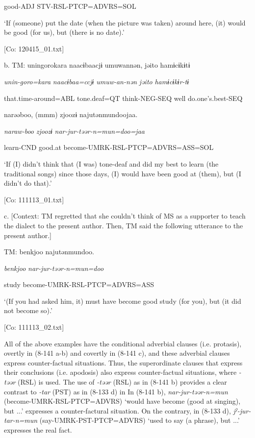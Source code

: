       good-ADJ  STV-RSL-PTCP=ADVRS=SOL  

      ‘If (someone) put the date (when the picture was taken) around here, (it) would be good (for us), but (there is no date).’

      [Co: 120415\_01.txt]

  b.  TM:  unin{\textbar}goro{\textbar}kara  naacɨbaacjɨ  umuwannən,  jəito  hamɨcɨkɨtɨ

      \textit{unin-goro=kara}  \textit{naacɨbaa=ccjɨ}  \textit{umuw-an-nən}  \textit{jəito}  \textit{hamɨcɨkɨr-tɨ}

      that.time-around=ABL  tone.deaf=QT  think-NEG-SEQ  well  do.one’s.best-SEQ

      narəəboo,  (mmm)  zjoozɨ  najutənmundoojaa.

      \textit{naraw-boo}    \textit{zjoozɨ}  \textit{nar-jur-təər{}-n=mun=doo=jaa}

      learn-CND    good.at  become-UMRK-RSL-PTCP=ADVRS=ASS=SOL

      ‘If (I) didn’t think that (I was) tone-deaf and did my best to learn (the traditional songs) since those days, (I) would have been good at (them), but (I didn’t do that).’

      [Co: 111113\_01.txt]

  c.  [Context: TM regretted that she couldn’t think of MS as a supporter to teach the dialect to the present author. Then, TM said the following utterance to the present author.]

    TM:  {\textbar}benkjoo{\textbar}  najutənmundoo.

      \textit{benkjoo}  \textit{nar-jur-təər{}-n=mun=doo}

      study  become-UMRK-RSL-PTCP=ADVRS=ASS

      ‘(If you had asked him, it) must have become good study (for you), but (it did not become so).’

      [Co: 111113\_02.txt]

All of the above examples have the conditional adverbial clauses (i.e. protasis), overtly in (8-141 a-b) and covertly in (8-141 c), and these adverbial clauses express counter-factual situations. Thus, the superordinate clauses that express their conclusions (i.e. apodosis) also express counter-factual situations, where \textit{{}-təər} (RSL) is used. The use of \textit{{}-təər} (RSL) as in (8-141 b) provides a clear contrast to \textit{{}-tar} (PST) as in (8-133 d) in  In (8-141 b), \textit{nar-jur-təər-n=mun} (become-UMRK-RSL-PTCP=ADVRS) ‘would have become (good at singing), but ...’ expresses a counter-factural situation. On the contrary, in (8-133 d), \textit{jˀ-jur-tar-n=mun} (say-UMRK-PST-PTCP=ADVRS) ‘used to say (a phrase), but ...’ expresses the real fact.

